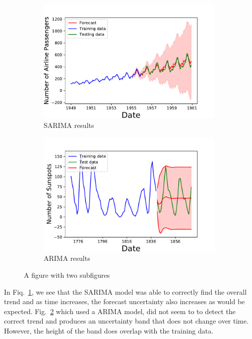 \documentclass[10pt,a4paper]{article}
\begin{document}
\begin{figure}[h]
\centering
\begin{subfigure}{.5\textwidth}
  \centering
  \includegraphics[scale=0.41]{Airline_Passengers_Forecast.pdf}
  \caption{SARIMA results}
  \label{fig:Airline ARIMA forecast}
\end{subfigure}%
\begin{subfigure}{.5\textwidth}
  \centering
  \includegraphics[scale=0.41]{Sunspot_Forecast.pdf}
\caption{ARIMA results}
  \label{fig:Sunspot ARIMA forecast}
\end{subfigure}
\caption{A figure with two subfigures}
\label{fig: Airline and SUNSPOT ARIMA}
\end{figure}

In Fiq.~\ref{fig:Airline ARIMA forecast}, we see that the SARIMA model was able to correctly find the overall trend and as time increases, the forecast uncertainty also increases as would be expected. Fig.~\ref{fig:Sunspot ARIMA forecast} which used a ARIMA model, did not seem to to detect the correct trend and produces an uncertainty band that does not change over time. However, the height of the band does overlap with the training data. 
\end{document}
